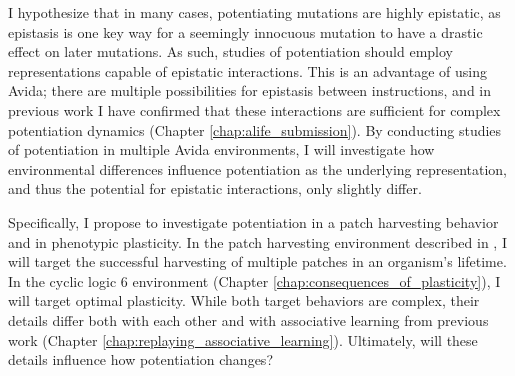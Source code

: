 
I hypothesize that in many cases, potentiating mutations are highly epistatic, as epistasis is one key way for a seemingly innocuous mutation to have a drastic effect on later mutations.
As such, studies of potentiation should employ representations capable of epistatic interactions. 
This is an advantage of using Avida; there are multiple possibilities for epistasis between instructions, and in previous work I have confirmed that these interactions are sufficient for complex potentiation dynamics (Chapter \ref{chap:alife_submission}).
By conducting studies of potentiation in multiple Avida environments, I will investigate how environmental differences influence potentiation as the underlying representation, and thus the potential for epistatic interactions, only slightly differ. 

Specifically, I propose to investigate potentiation in a patch harvesting behavior and in phenotypic plasticity. 
In the patch harvesting environment described in \citep{pontesEvolutionaryOriginsCognition2021}, I will target the successful harvesting of multiple patches in an organism's lifetime. %
In the cyclic logic 6 environment (Chapter \ref{chap:consequences_of_plasticity}), I will target optimal plasticity. 
While both target behaviors are complex, their details differ both with each other and with associative learning from previous work (Chapter \ref{chap:replaying_associative_learning}). 
Ultimately, will these details influence how potentiation changes? 


